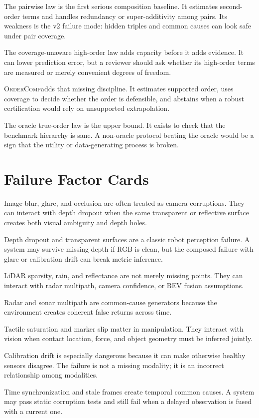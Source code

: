 \documentclass{article}
\newcommand{\method}{\textsc{OrderComp}}
\begin{document}
The pairwise law is the first serious composition baseline. It estimates second-order terms and handles redundancy or super-additivity among pairs. Its weakness is the v2 failure mode: hidden triples and common causes can look safe under pair coverage.

The coverage-unaware high-order law adds capacity before it adds evidence. It can lower prediction error, but a reviewer should ask whether its high-order terms are measured or merely convenient degrees of freedom.

\method adds that missing discipline. It estimates supported order, uses coverage to decide whether the order is defensible, and abstains when a robust certification would rely on unsupported extrapolation.

The oracle true-order law is the upper bound. It exists to check that the benchmark hierarchy is sane. A non-oracle protocol beating the oracle would be a sign that the utility or data-generating process is broken.

\section{Failure Factor Cards}

Image blur, glare, and occlusion are often treated as camera corruptions. They can interact with depth dropout when the same transparent or reflective surface creates both visual ambiguity and depth holes.

Depth dropout and transparent surfaces are a classic robot perception failure. A system may survive missing depth if RGB is clean, but the composed failure with glare or calibration drift can break metric inference.

LiDAR sparsity, rain, and reflectance are not merely missing points. They can interact with radar multipath, camera confidence, or BEV fusion assumptions.

Radar and sonar multipath are common-cause generators because the environment creates coherent false returns across time.

Tactile saturation and marker slip matter in manipulation. They interact with vision when contact location, force, and object geometry must be inferred jointly.

Calibration drift is especially dangerous because it can make otherwise healthy sensors disagree. The failure is not a missing modality; it is an incorrect relationship among modalities.

Time synchronization and stale frames create temporal common causes. A system may pass static corruption tests and still fail when a delayed observation is fused with a current one.
\end{document}
